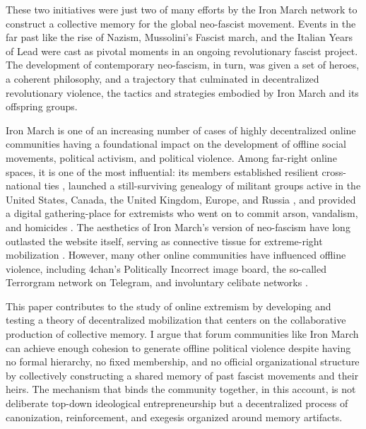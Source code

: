 \documentclass[bibtex,autowc,nonblind]{apsr_submission}
\begin{document}
These two initiatives were just two of many efforts by the Iron March network to construct a collective memory for the global neo-fascist movement. Events in the far past like the rise of Nazism, Mussolini's Fascist march, and the Italian Years of Lead were cast as pivotal moments in an ongoing revolutionary fascist project. The development of contemporary neo-fascism, in turn, was given a set of heroes, a coherent philosophy, and a trajectory that culminated in decentralized revolutionary violence, the tactics and strategies embodied by Iron March and its offspring groups.

Iron March is one of an increasing number of cases of highly decentralized online communities having a foundational impact on the development of offline social movements, political activism, and political violence. Among far-right online spaces, it is one of the most influential: its members established resilient cross-national ties \citep{upchurch}, launched a still-surviving genealogy of militant groups active in the United States, Canada, the United Kingdom, Europe, and Russia \citep{newhouse2021threat}, and provided a digital gathering-place for extremists who went on to commit arson, vandalism, and homicides \citep{singer2020iron}. The aesthetics of Iron March's version of neo-fascism have long outlasted the website itself, serving as connective tissue for extreme-right mobilization \citep{argentino2022one, colin2024and}. However, many other online communities have influenced offline violence, including 4chan's Politically Incorrect image board, the so-called Terrorgram network on Telegram, and involuntary celibate networks \citep{furstenberg2024decentralized}.

This paper contributes to the study of online extremism by developing and testing a theory of decentralized mobilization that centers on the collaborative production of collective memory. I argue that forum communities like Iron March can achieve enough cohesion to generate offline political violence despite having no formal hierarchy, no fixed membership, and no official organizational structure by collectively constructing a shared memory of past fascist movements and their heirs. The mechanism that binds the community together, in this account, is not deliberate top-down ideological entrepreneurship but a decentralized process of canonization, reinforcement, and exegesis organized around memory artifacts.
\end{document}
